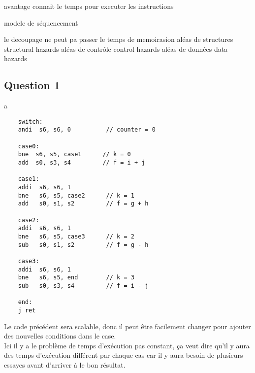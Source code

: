 \documentclass{article}
\begin{document}
avantage
connait le temps pour executer les instructions


modele de séquencement


le decoupage ne peut pa passer le temps de memoirasion
aléas de structures structural hazards
aléas de contrôle control hazards
aléas de données data hazards


\newpage\subsection*{Question 1}
\begin{resolution}
    a
    \begin{scriptsize}
        \myRISCV
        \begin{lstlisting}
    switch:
    andi  s6, s6, 0          // counter = 0
    
    case0:
    bne  s6, s5, case1      // k = 0
    add  s0, s3, s4         // f = i + j

    case1:
    addi  s6, s6, 1
    bne   s6, s5, case2      // k = 1
    add   s0, s1, s2         // f = g + h

    case2:
    addi  s6, s6, 1
    bne   s6, s5, case3      // k = 2
    sub   s0, s1, s2         // f = g - h

    case3:
    addi  s6, s6, 1
    bne   s6, s5, end        // k = 3
    sub   s0, s3, s4         // f = i - j

    end:
    j ret
        \end{lstlisting}
    \end{scriptsize}
    Le code précédent sera scalable, donc il peut être facilement changer pour ajouter des nouvelles conditions dans le case.\\

    Ici il y a le problème de temps d'exécution pas constant, ça veut dire qu'il y aura des temps d'exécution différent par chaque cas car il y aura besoin de plusieurs essayes avant d'arriver à le bon résultat.
\end{resolution}
\end{document}
